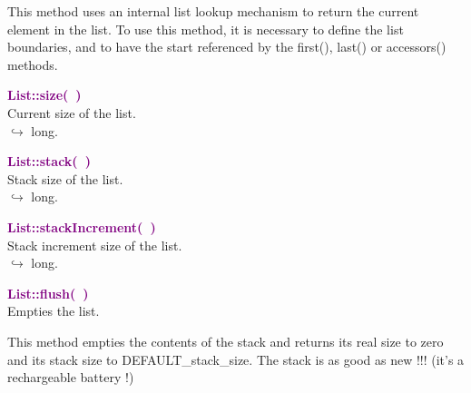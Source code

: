 This method uses an internal list lookup mechanism to return the current element in the list.
To use this method, it is necessary to define the list boundaries, and to have the start referenced by the first(), last() or accessors() methods.

\textcolor{purple}{\textbf{List::size(~)}}\label{List::size()}\\
Current size of the list.\\ \hspace*{10mm}$\hookrightarrow$ long.


\textcolor{purple}{\textbf{List::stack(~)}}\label{List::stack()}\\
Stack size of the list.\\ \hspace*{10mm}$\hookrightarrow$ long.


\textcolor{purple}{\textbf{List::stackIncrement(~)}}\label{List::stackIncrement()}\\
Stack increment size of the list.\\ \hspace*{10mm}$\hookrightarrow$ long.


\textcolor{purple}{\textbf{List::flush(~)}}\label{List::flush()}\\
Empties the list.

This method empties the contents of the stack and returns its real size to zero and its stack size to DEFAULT\_stack\_size.
The stack is as good as new !!! (it's a rechargeable battery !)

